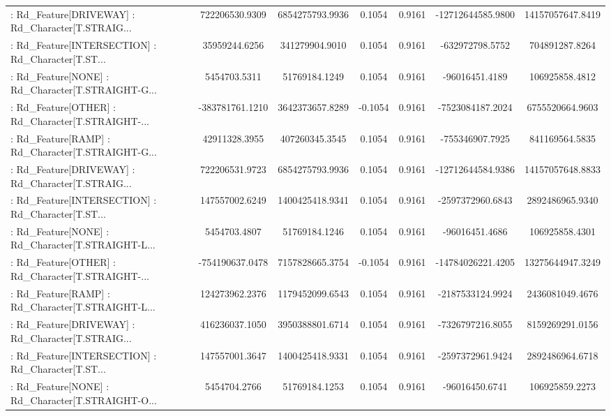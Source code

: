 \begin{longtable}{p{4cm}cccccc}
 : Rd\_Feature[DRIVEWAY] : Rd\_Character[T.STRAIG... &    722206530.9309 &   6854275793.9936 &  0.1054 &       0.9161 &  -12712644585.9800 &  14157057647.8419 \\
 : Rd\_Feature[INTERSECTION] : Rd\_Character[T.ST... &     35959244.6256 &    341279904.9010 &  0.1054 &       0.9161 &    -632972798.5752 &    704891287.8264 \\
 : Rd\_Feature[NONE] : Rd\_Character[T.STRAIGHT-G... &      5454703.5311 &     51769184.1249 &  0.1054 &       0.9161 &     -96016451.4189 &    106925858.4812 \\
 : Rd\_Feature[OTHER] : Rd\_Character[T.STRAIGHT-... &   -383781761.1210 &   3642373657.8289 & -0.1054 &       0.9161 &   -7523084187.2024 &   6755520664.9603 \\
 : Rd\_Feature[RAMP] : Rd\_Character[T.STRAIGHT-G... &     42911328.3955 &    407260345.3545 &  0.1054 &       0.9161 &    -755346907.7925 &    841169564.5835 \\
 : Rd\_Feature[DRIVEWAY] : Rd\_Character[T.STRAIG... &    722206531.9723 &   6854275793.9936 &  0.1054 &       0.9161 &  -12712644584.9386 &  14157057648.8833 \\
 : Rd\_Feature[INTERSECTION] : Rd\_Character[T.ST... &    147557002.6249 &   1400425418.9341 &  0.1054 &       0.9161 &   -2597372960.6843 &   2892486965.9340 \\
 : Rd\_Feature[NONE] : Rd\_Character[T.STRAIGHT-L... &      5454703.4807 &     51769184.1246 &  0.1054 &       0.9161 &     -96016451.4686 &    106925858.4301 \\
 : Rd\_Feature[OTHER] : Rd\_Character[T.STRAIGHT-... &   -754190637.0478 &   7157828665.3754 & -0.1054 &       0.9161 &  -14784026221.4205 &  13275644947.3249 \\
 : Rd\_Feature[RAMP] : Rd\_Character[T.STRAIGHT-L... &    124273962.2376 &   1179452099.6543 &  0.1054 &       0.9161 &   -2187533124.9924 &   2436081049.4676 \\
 : Rd\_Feature[DRIVEWAY] : Rd\_Character[T.STRAIG... &    416236037.1050 &   3950388801.6714 &  0.1054 &       0.9161 &   -7326797216.8055 &   8159269291.0156 \\
 : Rd\_Feature[INTERSECTION] : Rd\_Character[T.ST... &    147557001.3647 &   1400425418.9331 &  0.1054 &       0.9161 &   -2597372961.9424 &   2892486964.6718 \\
 : Rd\_Feature[NONE] : Rd\_Character[T.STRAIGHT-O... &      5454704.2766 &     51769184.1253 &  0.1054 &       0.9161 &     -96016450.6741 &    106925859.2273 \\

\end{longtable}
